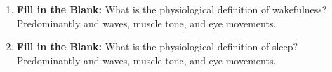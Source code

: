 \begin{enumerate}[label = \textbf{Q4.4.\arabic*}]
    \item \textbf{Fill in the Blank:} What is the physiological definition of wakefulness? Predominantly \underline{\hspace{3cm}} and \underline{\hspace{3cm}} waves, \underline{\hspace{3cm}} muscle tone, and \underline{\hspace{3cm}} eye movements.

    \item \textbf{Fill in the Blank:} What is the physiological definition of sleep? Predominantly \underline{\hspace{3cm}} and \underline{\hspace{3cm}} waves, \underline{\hspace{3cm}} muscle tone, and \underline{\hspace{3cm}} eye movements.


\end{enumerate}
